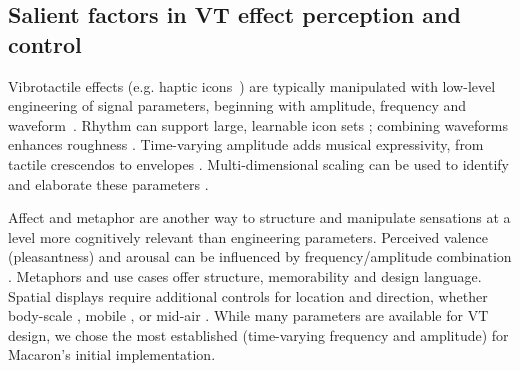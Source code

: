 \subsection{Salient factors in VT effect perception and control}
Vibrotactile effects (e.g. haptic icons~\cite{MacLean2003}) are typically manipulated with low-level engineering of signal parameters, beginning with  amplitude, frequency and waveform~\cite{Gunther2002,MacLean2003,Brewster2004,maclean2008foundations}.
%
Rhythm can support large, learnable icon sets \cite{Ternes2008,Swerdfeger2009a};  combining waveforms enhances roughness \cite{GunhyukPark2011}.
Time-varying amplitude adds musical expressivity, from tactile crescendos \cite{Brown2006} to 
envelopes \cite{Schneider2014}.
Multi-dimensional scaling %
can be used to identify %
and elaborate these parameters \cite{MacLean2003,VanErp2003,Enriquez2006,Hollins2000}.

Affect and metaphor are another way to structure and manipulate sensations at a level more cognitively relevant than engineering parameters.
Perceived valence (pleasantness) and arousal can be influenced by  frequency/amplitude combination \cite{YongjaeYoo2015,Obrist2015}.
Metaphors \cite{Chan2008,Obrist2013,Seifi2015} and use cases \cite{Chan2008,Seifi2015} offer structure, memorability and design language.
Spatial displays require additional controls for location and direction, %
whether body-scale \cite{Gunther2002,Israr2011a}, mobile  \cite{Seo2013}, or mid-air \cite{Obrist2015}.
While many parameters are available for VT design, we chose the most established (time-varying frequency and amplitude) for Macaron's initial implementation.

